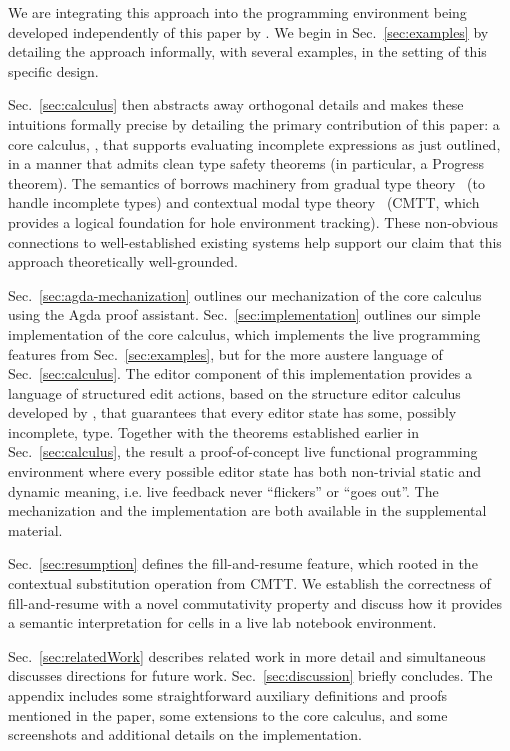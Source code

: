 
\newcommand{\contribution}[2]{\paragraph{#1. #2}} 

We are integrating this approach into the \Hazel programming environment being developed independently of this paper by \citet{HazelnutSNAPL}. 
We begin in Sec.~\ref{sec:examples} by detailing the approach informally, with several examples, in the setting of this specific design.

Sec.~\ref{sec:calculus} then abstracts away orthogonal details and makes these intuitions formally precise by detailing the primary contribution of this paper: a core calculus, \HazelnutLive, that supports evaluating incomplete expressions as just outlined, in a manner that admits clean type safety theorems (in particular, a Progress theorem). The semantics of \HazelnutLive borrows machinery from gradual type theory~\cite{DBLP:conf/snapl/SiekVCB15,Siek06a}
(to handle incomplete types) and contextual modal type theory~\cite{Nanevski2008} (CMTT,
which provides a logical foundation for hole environment tracking). 
These non-obvious connections to well-established existing systems help support our claim that this approach \IS theoretically well-grounded.

Sec.~\ref{sec:agda-mechanization} outlines our mechanization of the core calculus using the Agda proof assistant. 
Sec.~\ref{sec:implementation} outlines our simple implementation of the core calculus, which implements the live programming features from Sec.~\ref{sec:examples},
but for the more austere language of Sec.~\ref{sec:calculus}. 
The editor component of this implementation provides a language of structured edit actions, 
based on the \Hazelnut structure editor calculus developed by \cite{popl-paper}, that guarantees that
every editor state has some, possibly incomplete, type. 
Together with the theorems established earlier in Sec.~\ref{sec:calculus}, the result \IS a proof-of-concept
live functional programming environment where every possible editor state has both non-trivial static and dynamic 
meaning, i.e. live feedback never ``flickers'' or ``goes out''. 
The mechanization and the implementation are both available in the supplemental material.

Sec.~\ref{sec:resumption} defines the fill-and-resume feature, which \IS rooted in the contextual substitution operation from CMTT. We establish the correctness of fill-and-resume with a novel commutativity property and discuss how it provides a semantic interpretation for cells in a live lab notebook environment.

Sec.~\ref{sec:relatedWork} describes related work in more detail and simultaneous discusses directions for future work. Sec.~\ref{sec:discussion} briefly concludes. The appendix includes some straightforward auxiliary definitions and proofs mentioned in the paper, some extensions to the core calculus, and some screenshots and additional details on the implementation. 

